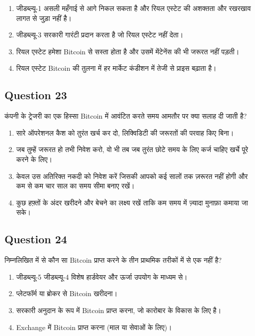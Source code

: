 \documentclass[12pt,a4paper]{article}
\begin{document}
\begin{enumerate}[label=\Alph*., leftmargin=*]
\item जीडब्ल्यू-1 असली महँगाई से आगे निकल सकता है और रियल एस्टेट की अशक्तता और रखरखाव लागत से जुड़ा नहीं है।
\item जीडब्ल्यू-3 सरकारी गारंटी प्रदान करता है जो रियल एस्टेट नहीं देता।
\item रियल एस्टेट हमेशा Bitcoin से सस्ता होता है और उसमें मेंटेनेंस की भी जरूरत नहीं पड़ती।
\item रियल एस्टेट Bitcoin की तुलना में हर मार्केट कंडीशन में तेजी से प्राइस बढ़ाता है।
\end{enumerate}

\bigskip


\subsection*{Question 23}
कंपनी के ट्रेजरी का एक हिस्सा Bitcoin में आवंटित करते समय आमतौर पर क्या सलाह दी जाती है?

\begin{enumerate}[label=\Alph*., leftmargin=*]
\item सारे ऑपरेशनल कैश को तुरंत खर्च कर दो, लिक्विडिटी की जरूरतों की परवाह किए बिना।
\item जब तुम्हें जरूरत हो तभी निवेश करो, वो भी तब जब तुरंत छोटे समय के लिए कर्ज चाहिए खर्चे पूरे करने के लिए।
\item केवल उस अतिरिक्त नकदी को निवेश करें जिसकी आपको कई सालों तक ज़रूरत नहीं होगी और कम से कम चार साल का समय सीमा बनाए रखें।
\item कुछ हफ़्तों के अंदर खरीदने और बेचने का लक्ष्य रखें ताकि कम समय में ज़्यादा मुनाफ़ा कमाया जा सके।
\end{enumerate}

\bigskip


\subsection*{Question 24}
निम्नलिखित में से कौन सा Bitcoin प्राप्त करने के तीन प्राथमिक तरीकों में से एक नहीं है?

\begin{enumerate}[label=\Alph*., leftmargin=*]
\item जीडब्ल्यू-5 जीडब्ल्यू-4 विशेष हार्डवेयर और ऊर्जा उपयोग के माध्यम से।
\item प्लेटफॉर्म या ब्रोकर से Bitcoin खरीदना।
\item सरकारी अनुदान के रूप में Bitcoin प्राप्त करना, जो कारोबार के विकास के लिए है।
\item Exchange में Bitcoin प्राप्त करना (माल या सेवाओं के लिए)।
\end{enumerate}
\end{document}
